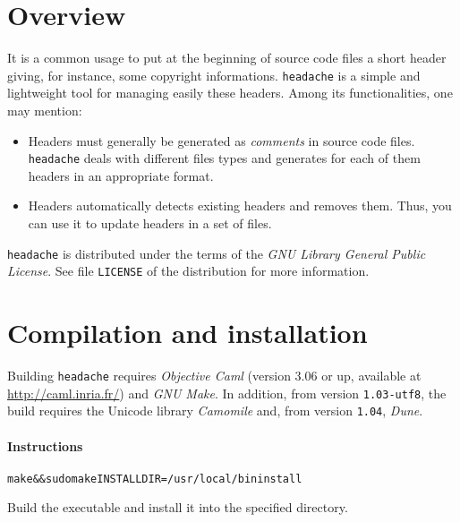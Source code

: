 \documentclass{article}
\title{\headache{}}
\author{Vincent Simonet}
\date{November, 2002}
\newcommand{\mytt}[1]{\texttt{#1}}
\newcommand{\headache}{\mytt{headache}}
\begin{document}
\maketitle


\section{Overview}

It is a common usage to put at the beginning of source code files a
short header giving, for instance, some copyright informations.
\headache{} is a simple and lightweight tool for managing easily these
headers.  Among its functionalities, one may mention:
\begin{itemize}
\item Headers must generally be generated as \emph{comments} in source
  code files.  \headache{} deals with different files types and generates
  for each of them headers in an appropriate format.
\item Headers automatically detects existing headers and removes them.
  Thus, you can use it to update headers in a set of files.
\end{itemize}

\headache{} is distributed under the terms of the \emph{GNU Library General
  Public License}.  See file \mytt{LICENSE} of the distribution for
more information.


\section{Compilation and installation}

Building \headache{} requires \emph{Objective Caml} (version 3.06 or up,
available at \url{http://caml.inria.fr/}) and \emph{GNU Make}.
In addition, from version \texttt{1.03-utf8}, the build requires the Unicode library \emph{Camomile} and, from version \texttt{1.04}, \emph{Dune}.

\paragraph{Instructions}

\begin{alltt}
  make && sudo make INSTALLDIR=/usr/local/bin install
\end{alltt}
Build the executable and install it into the specified directory.
\end{document}
